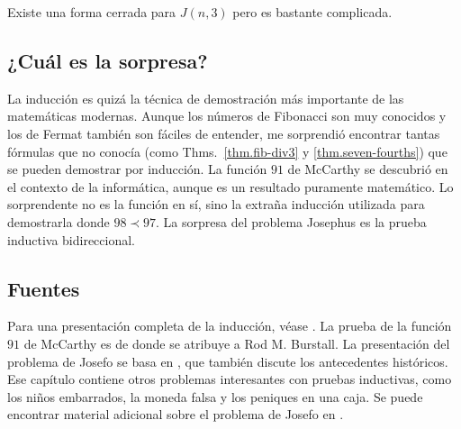 Existe una forma cerrada para $J(n,3)$ pero es bastante complicada.


\subsection*{¿Cuál es la sorpresa?}

La inducción es quizá la técnica de demostración más importante de las matemáticas modernas. Aunque los números de Fibonacci son muy conocidos y los de Fermat también son fáciles de entender, me sorprendió encontrar tantas fórmulas que no conocía (como Thms.~\ref{thm.fib-div3} y \ref{thm.seven-fourths}) que se pueden demostrar por inducción. La función $91$ de McCarthy se descubrió en el contexto de la informática, aunque es un resultado puramente matemático. Lo sorprendente no es la función en sí, sino la extraña inducción utilizada para demostrarla donde $98\prec 97$. La sorpresa del problema Josephus es la prueba inductiva bidireccional.

\subsection*{Fuentes}

Para una presentación completa de la inducción, véase \cite{gunderson}. La prueba de la función $91$ de McCarthy es de \cite{manna} donde se atribuye a Rod M. Burstall. La presentación del problema de Josefo se basa en \cite[Capítulo~17]{gunderson}, que también discute los antecedentes históricos. Ese capítulo contiene otros problemas interesantes con pruebas inductivas, como los niños embarrados, la moneda falsa y los peniques en una caja. Se puede encontrar material adicional sobre el problema de Josefo en \cite{schumer,wiki:josephus}.
